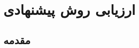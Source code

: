 
\chapter{ارزیابی روش پیشنهادی} \label{ch:eval}
\thispagestyle{empty}


\section{مقدمه}
\paragraph{}{

}



